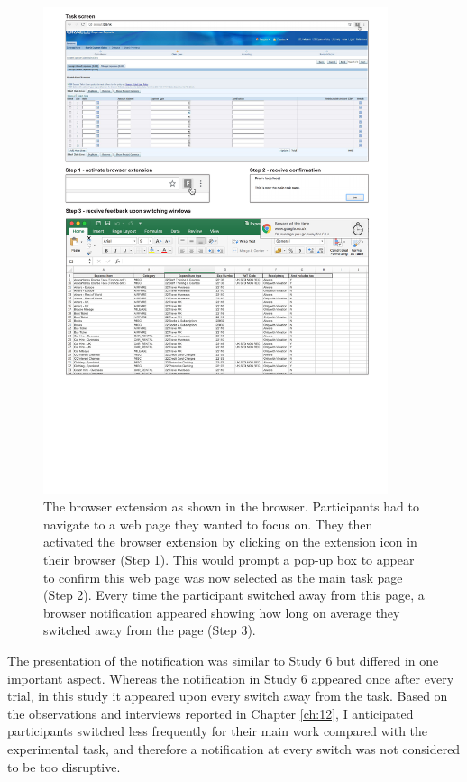 \begin{figure}
\centering
\centerline{\includegraphics[width=0.9\textwidth]{images/ch56/ch56-7_taskinterface.pdf}}
\caption[Study 7 browser extension]{The browser extension as shown in the browser. Participants had to navigate to a web page they wanted to focus on. They then activated the browser extension by clicking on the extension icon in their browser (Step 1). This would prompt a pop-up box to appear to confirm this web page was now selected as the main task page (Step 2). Every time the participant switched away from this page, a browser notification appeared showing how long on average they switched away from the page (Step 3).}
\label{fig:ch56-7_taskinterface}
\end{figure}

The presentation of the notification was similar to Study \hyperref[st:Study6]{6} but differed in one important aspect. Whereas the notification in Study \hyperref[st:Study6]{6} appeared once after every trial, in this study it appeared upon every switch away from the task. Based on the observations and interviews reported in Chapter \ref{ch:12}, I anticipated participants switched less frequently for their main work compared with the experimental task, and therefore a notification at every switch was not considered to be too disruptive.

